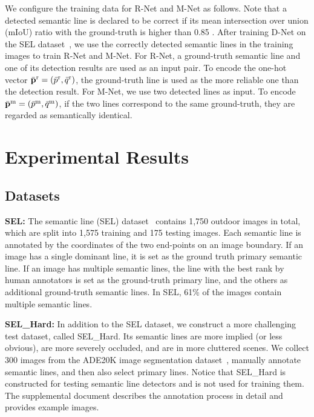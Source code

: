 \documentclass[runningheads]{llncs}
\begin{document}
We configure the training data for R-Net and M-Net as follows. Note that a detected semantic line is declared to be correct if its mean intersection over union (mIoU) ratio with the ground-truth is higher than 0.85 \cite{lee2017}. After training D-Net on the SEL dataset~\cite{lee2017}, we use the correctly detected semantic lines in the training images to train R-Net and M-Net. For R-Net, a ground-truth semantic line and one of its detection results are used as an input pair. To encode the one-hot vector $\bar{\bf p}^{\rm r}=(\bar{p}^{\rm r}, \bar{q}^{\rm r})$, the ground-truth line is used as the more reliable one than the detection result. For M-Net, we use two detected lines as input. To encode $\bar{\bf p}^{\rm m}=(\bar{p}^{\rm m}, \bar{q}^{\rm m})$, if the two lines correspond to the same ground-truth, they are regarded as semantically identical.


\section{Experimental Results}

\subsection{Datasets}

\noindent\textbf{SEL:}
The semantic line (SEL) dataset~\cite{lee2017} contains 1,750 outdoor images in total, which are split into 1,575 training and 175 testing images. Each semantic line is annotated by the coordinates of the two end-points on an image boundary. If an image has a single dominant line, it is set as the ground truth primary semantic line. If an image has multiple semantic lines, the line with the best rank by human annotators is set as the ground-truth primary line, and the others as additional ground-truth semantic lines. In SEL, 61\% of the images contain multiple semantic lines.





\noindent\textbf{SEL\_Hard:}
In addition to the SEL dataset, we construct a more challenging test dataset, called SEL\_Hard. Its semantic lines are more implied (or less obvious), are more severely occluded, and are in more cluttered scenes. We collect 300 images from the ADE20K image segmentation dataset~\cite{zhou2017_ade}, manually annotate semantic lines, and then also select primary lines. Notice that SEL\_Hard is constructed for testing semantic line detectors and is not used for training them. The supplemental document describes the annotation process in detail and provides example images.
\end{document}
